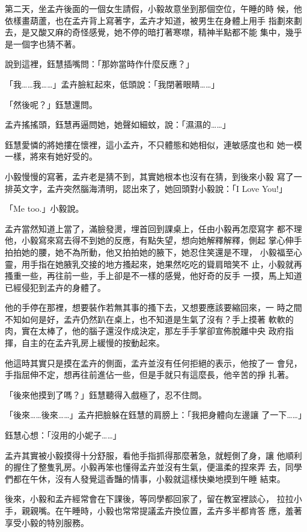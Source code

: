 第二天，坐孟卉後面的一個女生請假，小毅故意坐到那個空位，午睡的時
候，他依樣畫葫蘆，也在孟卉背上寫著字，孟卉才知道，被男生在身體上用手
指劃來劃去，是又酸又麻的奇怪感覺，她不停的暗打著寒噤，精神半點都不能
集中，幾乎是一個字也猜不著。

說到這裡，鈺慧插嘴問：「那妳當時作什麼反應？」

「我……我……」孟卉臉紅起來，低頭說：「我閉著眼睛……」

「然後呢？」鈺慧還問。

孟卉搖搖頭，鈺慧再逼問她，她聲如細蚊，說：「濕濕的……」

鈺慧愛憐的將她摟在懷裡，這小孟卉，不只體態和她相似，連敏感度也和
她一模一樣，將來有她好受的。

小毅慢慢的寫著，孟卉老是猜不到，其實她根本也沒有在猜，到後來小毅
寫了一排英文字，孟卉突然腦海清明，認出來了，她回頭對小毅說：「I Love
You!」

「Me too.」小毅說。

孟卉當然知道上當了，滿臉發燙，埋首回到課桌上，任由小毅再怎麼寫字
都不理他，小毅寫來寫去得不到她的反應，有點失望，想向她解釋解釋，側起
掌心伸手拍拍她的腰，她不為所動，他又拍拍她的腋下，她忍住笑還是不理，
小毅福至心靈，用手指在她腋乳交接的地方搔起來，她果然吃吃的聳肩暗笑不
止，小毅就再搔重一些，再往前一些，手上卻是不一樣的感覺，他好奇的反手
一摸，馬上知道已經侵犯到孟卉的身體了。

他的手停在那裡，想要裝作若無其事的搔下去，又想要應該要縮回來，一
時之間不知如何是好，孟卉仍然趴在桌上，也不知道是生氣了沒有？手上摸著
軟軟的肉，實在太棒了，他的腦子還沒作成決定，那左手手掌卻宣佈脫離中央
政府指揮，自主的在孟卉乳房上緩慢的按動起來。

他這時其實只是摸在孟卉的側面，孟卉並沒有任何拒絕的表示，他按了一
會兒，手指屈伸不定，想再往前進佔一些，但是手就只有這麼長，他辛苦的掙
扎著。

「後來他摸到了嗎？」鈺慧聽得入戲極了，忍不住問。

「後來……後來……」孟卉把臉躲在鈺慧的肩膀上：「我把身體向左邊讓
了一下……」

鈺慧心想：「沒用的小妮子……」

孟卉其實被小毅摸得十分舒服，看他手指抓得那麼著急，就輕側了身，讓
他順利的握住了整隻乳房。小毅再笨也懂得孟卉並沒有生氣，便溫柔的捏來弄
去，同學們都在午休，沒有人發覺這香豔的情事，小毅就這樣快樂地摸到午睡
結束。

後來，小毅和孟卉經常會在下課後，等同學都回家了，留在教室裡談心，
拉拉小手，親親嘴。在午睡時，小毅也常常提議孟卉換位置，孟卉多半都肯答
應，羞著享受小毅的特別服務。

